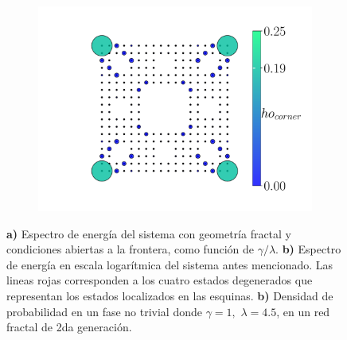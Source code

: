 \begin{figure}[h!]
\begin{subfigure}[b!]{0.3 \textwidth}
         \label{}
     \end{subfigure}\hspace*{-0.5em} 
      \begin{subfigure}[b!]{0.4 \textwidth}
         \caption{}
         \includegraphics[width=\textwidth]{Imagenes/Resultados_Hoti_Fractal/proyection_square.pdf}
         \label{}
     \end{subfigure}\hspace*{-0.5em} \vspace*{-1.5em}
        \caption{\textbf{a)} Espectro de energía del sistema con geometría fractal y condiciones abiertas a la frontera, como función de $\gamma/\lambda$. \textbf{b)} Espectro de energía en escala logarítmica del sistema antes mencionado. Las lineas rojas corresponden a los cuatro estados degenerados que representan los estados localizados en las esquinas. \textbf{b)} Densidad de probabilidad en un fase no trivial donde $\gamma = 1,\, \, \lambda = 4.5$, en un red fractal de 2da generación.}
\label{fig:Param_Proy_fractal}
\end{figure}